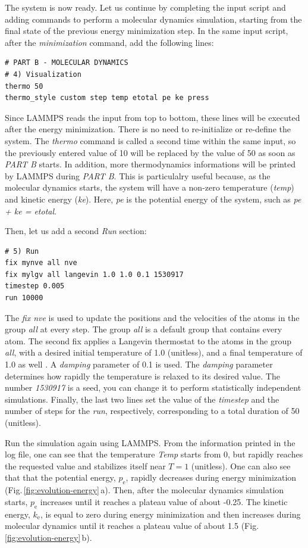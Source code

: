 \documentclass[9pt,tutorial]{livecoms}
\begin{document}
The system is now ready. Let us continue by completing the input script and adding commands to perform a molecular dynamics simulation, starting from the final state of the previous energy minimization step. In the same input script, after the \textit{minimization} command, add the following
lines:
{\normalsize \begin{verbatim}
# PART B - MOLECULAR DYNAMICS
# 4) Visualization
thermo 50
thermo_style custom step temp etotal pe ke press
\end{verbatim}}
Since LAMMPS reads the input from top to bottom, these lines will be executed after the energy minimization. There is no need to re-initialize or re-define the system. The \textit{thermo} command is called a second time within the same input, so the previously entered value of 10 will be replaced by the value of 50 as soon as \textit{PART B} starts. In addition, more thermodynamics informations will be printed by LAMMPS during \textit{PART B}. This is particulalry useful because, as the molecular dynamics starts, the system will have a non-zero temperature (\textit{temp}) and kinetic energy (\textit{ke}). Here, \textit{pe} is the potential energy of the system, such as \textit{pe + ke = etotal}.

Then, let us add a second \textit{Run} section:
{\normalsize \begin{verbatim}
# 5) Run
fix mynve all nve
fix mylgv all langevin 1.0 1.0 0.1 1530917
timestep 0.005
run 10000
\end{verbatim}}
The \textit{fix nve} is used to update the positions and the velocities of the atoms in the group \textit{all} at every step. The group \textit{all} is a default group that contains every atom. The second fix applies a Langevin thermostat to the atoms in the group \textit{all}, with a desired initial temperature of 1.0 (unitless), and a final temperature of 1.0 as well \cite{schneider1978molecular}. A \textit{damping} parameter of 0.1 is used. The \textit{damping} parameter determines how rapidly the temperature is relaxed to its desired value. The number \textit{1530917} is a seed, you can change it to perform statistically independent simulations. Finally, the last two lines set the value of the \textit{timestep} and the number of steps for the \textit{run}, respectively, corresponding to a total duration of 50 (unitless).

Run the simulation again using LAMMPS. From the information printed in the log file, one can see that the temperature \textit{Temp} starts from 0, but rapidly reaches the requested value and stabilizes itself near $T=1$ (unitless). One can also see that that the potential energy, $p_\text{e}$, rapidly decreases during energy minimization (Fig.\,\ref{fig:evolution-energy}\,a). Then, after the molecular dynamics simulation starts, $p_\text{e}$ increases until it reaches a plateau value of about -0.25. The kinetic energy, $k_\text{e}$, is equal to zero during energy minimization and then increases during molecular dynamics until it reaches a plateau value of about 1.5 (Fig.\,\ref{fig:evolution-energy}\,b).
\end{document}
